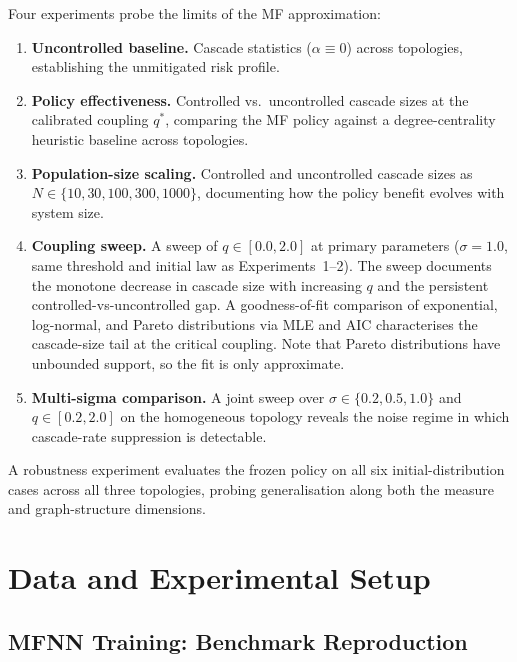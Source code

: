\documentclass[11pt]{article}
\begin{document}
Four experiments probe the limits of the MF approximation:
\begin{enumerate}
  \item \textbf{Uncontrolled baseline.} Cascade statistics ($\alpha \equiv 0$) across topologies, establishing the unmitigated risk profile.
  \item \textbf{Policy effectiveness.} Controlled vs.\ uncontrolled cascade sizes at the calibrated coupling $q^*$, comparing the MF policy against a degree-centrality heuristic baseline across topologies.
  \item \textbf{Population-size scaling.} Controlled and uncontrolled cascade sizes as $N \in \{10, 30, 100, 300, 1000\}$, documenting how the policy benefit evolves with system size.
  \item \textbf{Coupling sweep.} A sweep of $q \in [0.0, 2.0]$ at primary parameters ($\sigma=1.0$, same threshold and initial law as Experiments~1--2). The sweep documents the monotone decrease in cascade size with increasing $q$ and the persistent controlled-vs-uncontrolled gap. A goodness-of-fit comparison of exponential, log-normal, and Pareto distributions via MLE and AIC characterises the cascade-size tail at the critical coupling. Note that Pareto distributions have unbounded support, so the fit is only approximate.
  \item \textbf{Multi-sigma comparison.} A joint sweep over $\sigma \in \{0.2, 0.5, 1.0\}$ and $q \in [0.2, 2.0]$ on the homogeneous topology reveals the noise regime in which cascade-rate suppression is detectable.
\end{enumerate}
A robustness experiment evaluates the frozen policy on all six initial-distribution cases across all three topologies, probing generalisation along both the measure and graph-structure dimensions.


\section{Data and Experimental Setup}

\subsection{MFNN Training: Benchmark Reproduction}
\end{document}
